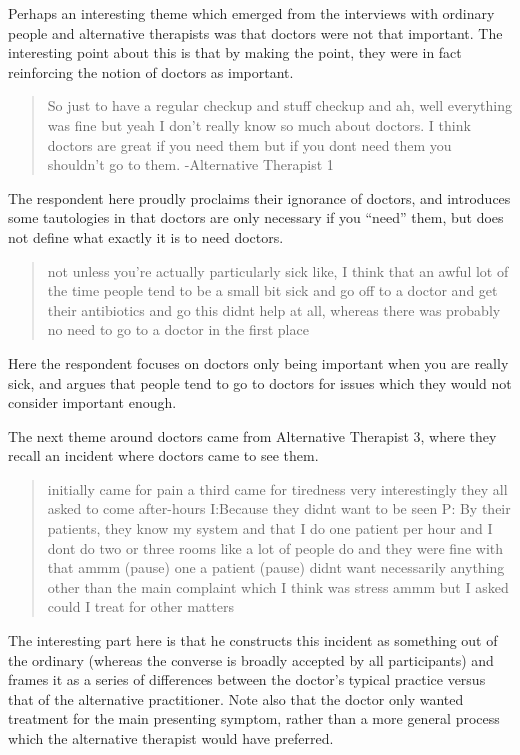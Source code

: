 Perhaps an interesting theme which emerged from the interviews with ordinary people and alternative therapists was that doctors were not that important. The interesting point about this is that by making the point, they were in fact reinforcing the notion of doctors as important. 

\begin{quotation}
  So just to have a regular checkup and stuff checkup and ah, well everything was fine but yeah I don't really know so much about doctors. I think doctors are great if you need them but if you dont need them you shouldn't go to them.  -Alternative Therapist 1

\end{quotation} 

The respondent here proudly proclaims their ignorance of doctors, and introduces some tautologies in that doctors are only necessary if you ``need'' them, but does not define what exactly it is to need doctors. 

\begin{quotation}
  not unless you're actually particularly sick like, I think that an awful lot of the time people tend to be a small bit sick and go off to a doctor and get their antibiotics and go this didnt help at all, whereas there was probably no need to go to a doctor in the first place 

\end{quotation}

Here the respondent focuses on doctors only being important when you are really sick, and argues that people tend to go to doctors for issues which they would not consider important enough. 

The next theme around doctors came from Alternative Therapist 3, where they recall an incident where doctors came to see them. 

\begin{quotation}
  initially came for pain a third came for tiredness very interestingly they all asked to come after-hours 
I:Because they didnt want to be seen
P: By their patients, they know my system and that I do one patient per hour and I dont do two or three rooms like a lot of people do and they were fine with that ammm (pause) one a patient (pause) didnt want necessarily anything other than the main complaint which I think was stress ammm but I asked could I treat for other matters 

\end{quotation}

The interesting part here is that he constructs this incident as something out of the ordinary (whereas the converse is broadly accepted by all participants) and frames it as a series of differences between the doctor's typical practice versus that of the alternative practitioner. Note also that the doctor only wanted treatment for the main presenting symptom, rather than a more general process which the alternative therapist would have preferred. 


